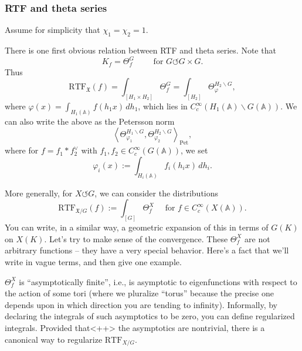 \documentclass[reqno]{amsart} 
\numberwithin{theorem}{section}
\numberwithin{equation}{section}
\numberwithin{exercise}{section}
\begin{document}
\subsubsection{RTF and theta series}\label{sec:cq6thubysx}

Assume for simplicity that $\chi_1 = \chi_2 = 1$.

There is one first obvious relation between RTF and theta series.  Note that
\begin{equation*}
  K_f = \Theta_f^G \qquad \text{ for } G \circlearrowleft G \times G.
\end{equation*}
Thus
\begin{equation*}
  \mathrm{RTF}_{\mathfrak{X}}(f) = \int_{[H_1 \times H_2]} \Theta_f^G = \int_{[H_2]} \Theta_\varphi^{H_2 \backslash G},
\end{equation*}
where $\varphi(x) = \int_{H_1(\mathbb{A})} f(h_1 x) \, d h_1$, which lies in $C_c^\infty(H_1(\mathbb{A}) \backslash G(\mathbb{A}))$.  We can also write the above as the Petersson norm
\begin{equation*}
  \left\langle \Theta^{H_1 \backslash G}_{\varphi_1}, \Theta_{\varphi_2}^{H_2 \backslash G} \right\rangle_{\mathrm{Pet}},
\end{equation*}
where for $f = f_1 \ast f_2^\vee$ with $f_1, f_2 \in C_c^\infty(G(\mathbb{A}))$, we set
\begin{equation*}
  \varphi_i(x) := \int_{H_i(\mathbb{A})} f_i(h_i x) \, d h_i.
\end{equation*}

More generally, for $X \circlearrowleft G$, we can consider the distributions
\begin{equation*}
  \mathrm{RTF}_{\mathfrak{X}/G}(f) := \int_{[G]} \Theta^X_f \quad \text{ for } f \in C_c^\infty(X(\mathbb{A})).
\end{equation*}
You can write, in a similar way, a geometric expansion of this in terms of $G(K)$ on $X(K)$.  Let's try to make sense of the convergence.  These $\Theta_f^X$ are not arbitrary functions -- they have a very special behavior.  Here's a fact that we'll write in vague terms, and then give one example.
\begin{fact}\label{fact:cq6thubvi6}
  $\Theta^X_f$ is ``asymptotically finite'', i.e., is asymptotic to eigenfunctions with respect to the action of some tori (where we pluralize ``torus'' because the precise one depends upon in which direction you are tending to infinity).  Informally, by declaring the integrals of such asymptotics to be zero, you can define regularized integrals.  Provided that<++> the asymptotics are nontrivial, there is a canonical way to regularize $\mathrm{RTF}_{X / G}$.
\end{fact}
\end{document}
